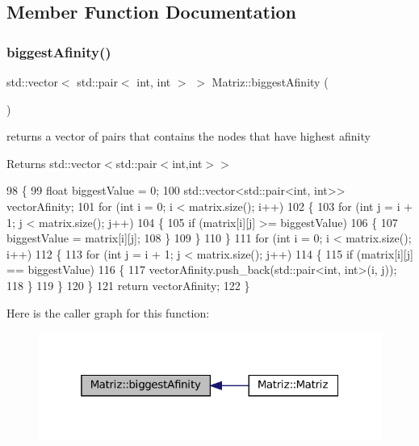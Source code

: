 \subsection{Member Function Documentation}
\mbox{\label{classMatriz_a2867d653d30b7fd8ca13e683bd7b8de6}} 
\subsubsection{\texorpdfstring{biggest\+Afinity()}{biggestAfinity()}}
{\footnotesize\ttfamily std\+::vector$<$ std\+::pair$<$ int, int $>$ $>$ Matriz\+::biggest\+Afinity (\begin{DoxyParamCaption}{ }\end{DoxyParamCaption})}



returns a vector of pairs that contains the nodes that have highest afinity 

\begin{DoxyReturn}{Returns}
std\+::vector$<$std\+::pair$<$int,int$>$$>$ 
\end{DoxyReturn}

\begin{DoxyCode}
98 \{
99   \textcolor{keywordtype}{float} biggestValue = 0;
100   std::vector<std::pair<int, int>> vectorAfinity;
101   \textcolor{keywordflow}{for} (\textcolor{keywordtype}{int} i = 0; i < matrix.size(); i++)
102   \{
103     \textcolor{keywordflow}{for} (\textcolor{keywordtype}{int} j = i + 1; j < matrix.size(); j++)
104     \{
105       \textcolor{keywordflow}{if} (matrix[i][j] >= biggestValue)
106       \{
107         biggestValue = matrix[i][j];
108       \}
109     \}
110   \}
111   \textcolor{keywordflow}{for} (\textcolor{keywordtype}{int} i = 0; i < matrix.size(); i++)
112   \{
113     \textcolor{keywordflow}{for} (\textcolor{keywordtype}{int} j = i + 1; j < matrix.size(); j++)
114     \{
115       \textcolor{keywordflow}{if} (matrix[i][j] == biggestValue)
116       \{
117         vectorAfinity.push\_back(std::pair<int, int>(i, j));
118       \}
119     \}
120   \}
121   \textcolor{keywordflow}{return} vectorAfinity;
122 \}
\end{DoxyCode}
Here is the caller graph for this function\+:
\nopagebreak
\begin{figure}[H]
\begin{center}
\leavevmode
\includegraphics[width=319pt]{classMatriz_a2867d653d30b7fd8ca13e683bd7b8de6_icgraph}
\end{center}
\end{figure}
\mbox{\label{classMatriz_a30e8aba7a2868aaa98f11d3037ff8319}} 
